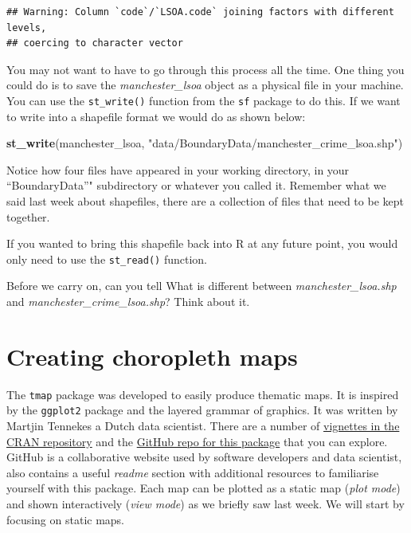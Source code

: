 \documentclass[]{book}
\newenvironment{Shaded}{\begin{snugshade}}{\end{snugshade}}
\newcommand{\KeywordTok}[1]{\textcolor[rgb]{0.13,0.29,0.53}{\textbf{#1}}}
\newcommand{\NormalTok}[1]{#1}
\newcommand{\StringTok}[1]{\textcolor[rgb]{0.31,0.60,0.02}{#1}}
\begin{document}
\begin{verbatim}
## Warning: Column `code`/`LSOA.code` joining factors with different levels,
## coercing to character vector
\end{verbatim}

You may not want to have to go through this process all the time. One thing you could do is to save the \emph{manchester\_lsoa} object as a physical file in your machine. You can use the \texttt{st\_write()} function from the \texttt{sf} package to do this. If we want to write into a shapefile format we would do as shown below:

\begin{Shaded}
\begin{Highlighting}[]
\KeywordTok{st_write}\NormalTok{(manchester_lsoa, }\StringTok{"data/BoundaryData/manchester_crime_lsoa.shp"}\NormalTok{)}
\end{Highlighting}
\end{Shaded}

Notice how four files have appeared in your working directory, in your ``BoundaryData''" subdirectory or whatever you called it. Remember what we said last week about shapefiles, there are a collection of files that need to be kept together.

If you wanted to bring this shapefile back into R at any future point, you would only need to use the \texttt{st\_read()} function.

Before we carry on, can you tell What is different between \emph{manchester\_lsoa.shp} and \emph{manchester\_crime\_lsoa.shp}? Think about it.

\hypertarget{creating-choropleth-maps}{%
\section{Creating choropleth maps}\label{creating-choropleth-maps}}

The \texttt{tmap} package was developed to easily produce thematic maps. It is inspired by the \texttt{ggplot2} package and the layered grammar of graphics. It was written by Martjin Tennekes a Dutch data scientist. There are a number of \href{https://cran.r-project.org/web/packages/tmap/index.html}{vignettes in the CRAN repository} and the \href{https://github.com/mtennekes/tmap}{GitHub repo for this package} that you can explore. GitHub is a collaborative website used by software developers and data scientist, also contains a useful \emph{readme} section with additional resources to familiarise yourself with this package. Each map can be plotted as a static map (\emph{plot mode}) and shown interactively (\emph{view mode}) as we briefly saw last week. We will start by focusing on static maps.
\end{document}
